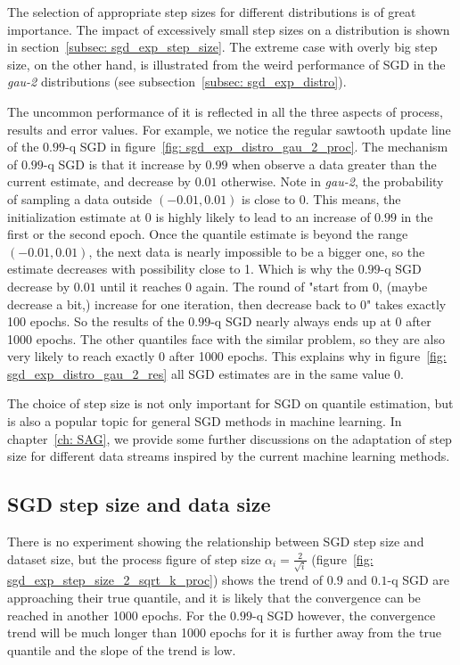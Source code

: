 The selection of appropriate step sizes for different distributions is of great importance. The impact of excessively small step sizes on a distribution is shown in section~\ref{subsec: sgd_exp_step_size}. The extreme case with overly big step size, on the other hand, is illustrated from the weird performance of SGD in the \textit{gau-2} distributions (see subsection~\ref{subsec: sgd_exp_distro}).

The uncommon performance of it is reflected in all the three aspects of process, results and error values. For example, we notice the regular sawtooth update line of the $0.99$-q SGD in figure~\ref{fig: sgd_exp_distro_gau_2_proc}. The mechanism of $0.99$-q SGD is that it increase by $0.99$ when observe a data greater than the current estimate, and decrease by $0.01$ otherwise. Note in \textit{gau-2}, the probability of sampling a data outside $(-0.01, 0.01)$ is close to 0. This means, the initialization estimate at 0 is highly likely to lead to an increase of $0.99$ in the first or the second epoch. Once the quantile estimate is beyond the range $(-0.01, 0.01)$, the next data is nearly impossible to be a bigger one, so the estimate decreases with possibility close to 1. Which is why the $0.99$-q SGD decrease by $0.01$ until it reaches 0 again. The round of "start from 0, (maybe decrease a bit,) increase for one iteration, then decrease back to 0" takes exactly 100 epochs. So the results of the $0.99$-q SGD nearly always ends up at 0 after 1000 epochs. The other quantiles face with the similar problem, so they are also very likely to reach exactly 0 after 1000 epochs. This explains why in figure~\ref{fig: sgd_exp_distro_gau_2_res} all SGD estimates are in the same value $0$. 

The choice of step size is not only important for SGD on quantile estimation, but is also a popular topic for general SGD methods in machine learning. In chapter~\ref{ch: SAG}, we provide some further discussions on the adaptation of step size for different data streams inspired by the current machine learning methods.

\subsection{SGD step size and data size}

There is no experiment showing the relationship between SGD step size and dataset size, but the process figure of step size $\alpha_i = \frac{2}{\sqrt{i}}$ (figure~\ref{fig: sgd_exp_step_size_2_sqrt_k_proc}) shows the trend of $0.9$ and $0.1$-q SGD are approaching their true quantile, and it is likely that the convergence can be reached in another 1000 epochs. For the $0.99$-q SGD however, the convergence trend will be much longer than 1000 epochs for it is further away from the true quantile and the slope of the trend is low.

